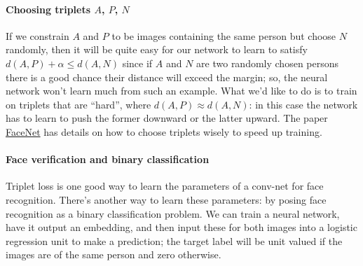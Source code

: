 \documentclass[12pt]{article}
\begin{document}
\paragraph{Choosing triplets $A$, $P$, $N$} If we constrain $A$ and $P$ to be images containing the same person but choose $N$ randomly, then it will be quite easy for our network to learn to satisfy $d(A,P) + \alpha \leq d(A,N)$ since if $A$ and $N$ are two randomly chosen persons there is a good chance their distance will exceed the margin; so, the neural network won't learn much from such an example. What we'd like to do is to train on triplets that are ``hard'', where $d(A,P) \approx d(A,N)$: in this case the network has to learn to push the former downward or the latter upward. The paper \href{https://arxiv.org/abs/1503.03832}{FaceNet} has details on how to choose triplets wisely to speed up training.

\paragraph{Face verification and binary classification} Triplet loss is one good way to learn the parameters of a conv-net for face recognition. There's another way to learn these parameters: by posing face recognition as a binary classification problem. We can train a neural network, have it output an embedding, and then input these for both images into a logistic regression unit to make a prediction; the target label will be unit valued if the images are of the same person and zero otherwise.
\end{document}
